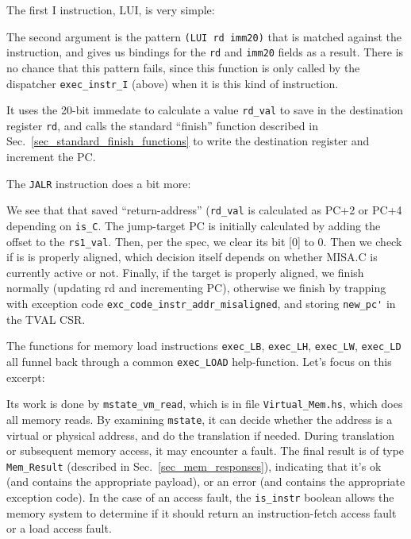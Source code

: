 \documentclass[11pt]{article}
\begin{document}
The first I instruction, LUI, is very simple:



The second argument is the pattern \verb|(LUI rd imm20)| that is
matched against the instruction, and gives us bindings for the
\verb|rd| and \verb|imm20| fields as a result.  There is no chance
that this pattern fails, since this function is only called by the
dispatcher \verb|exec_instr_I| (above) when it is this kind of
instruction.

It uses the 20-bit immedate to calculate a value \verb|rd_val| to save
in the destination register \verb|rd|, and calls the standard
``finish'' function described in
Sec.~\ref{sec_standard_finish_functions} to write the destination
register and increment the PC.


The \verb|JALR| instruction does a bit more:



We see that that saved ``return-address'' (\verb|rd_val| is calculated
as PC+2 or PC+4 depending on \verb|is_C|.  The jump-target PC is
initially calculated by adding the offset to the \verb|rs1_val|.
Then, per the spec, we clear its bit [0] to 0.  Then we check if is is
properly aligned, which decision itself depends on whether MISA.C is
currently active or not.  Finally, if the target is properly aligned,
we finish normally (updating rd and incrementing PC), otherwise we
finish by trapping with exception code
\verb|exc_code_instr_addr_misaligned|, and storing \verb|new_pc'| in
the TVAL CSR.

The functions for memory load instructions \verb|exec_LB|,
\verb|exec_LH|, \verb|exec_LW|, \verb|exec_LD| all funnel back through
a common \verb|exec_LOAD| help-function.  Let's focus on this excerpt:



Its work is done by \verb|mstate_vm_read|, which is in file
\verb|Virtual_Mem.hs|, which does all memory reads.  By examining
\verb|mstate|, it can decide whether the address is a virtual or
physical address, and do the translation if needed.  During
translation or subsequent memory access, it may encounter a fault.
The final result is of type \verb|Mem_Result| (described in
Sec.~\ref{sec_mem_responses}), indicating that it's ok (and contains
the appropriate payload), or an error (and contains the appropriate
exception code).  In the case of an access fault, the \verb|is_instr|
boolean allows the memory system to determine if it should return an
instruction-fetch access fault or a load access fault.
\end{document}
